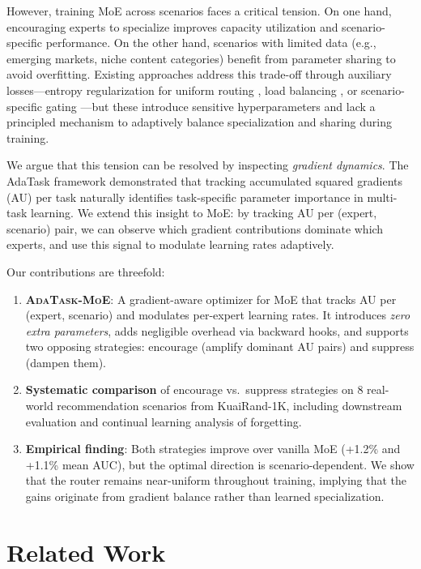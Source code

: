 \documentclass{article}
\begin{document}
However, training MoE across scenarios faces a critical tension.
On one hand, encouraging experts to specialize improves capacity utilization and scenario-specific performance.
On the other hand, scenarios with limited data (e.g., emerging markets, niche content categories) benefit from parameter sharing to avoid overfitting.
Existing approaches address this trade-off through auxiliary losses---entropy regularization for uniform routing \cite{fedus2022switch}, load balancing \cite{lepikhin2020gshard}, or scenario-specific gating \cite{ma2018modeling}---but these introduce sensitive hyperparameters and lack a principled mechanism to adaptively balance specialization and sharing during training.

We argue that this tension can be resolved by inspecting \emph{gradient dynamics}.
The AdaTask framework \cite{yang2023adatask} demonstrated that tracking accumulated squared gradients (AU) per task naturally identifies task-specific parameter importance in multi-task learning.
We extend this insight to MoE: by tracking AU per (expert, scenario) pair, we can observe which gradient contributions dominate which experts, and use this signal to modulate learning rates adaptively.

Our contributions are threefold:
\begin{enumerate}
    \item \textbf{\textsc{AdaTask-MoE}}: A gradient-aware optimizer for MoE that tracks AU per (expert, scenario) and modulates per-expert learning rates. It introduces \emph{zero extra parameters}, adds negligible overhead via backward hooks, and supports two opposing strategies: encourage (amplify dominant AU pairs) and suppress (dampen them).

    \item \textbf{Systematic comparison} of encourage vs.\ suppress strategies on 8 real-world recommendation scenarios from KuaiRand-1K, including downstream evaluation and continual learning analysis of forgetting.

    \item \textbf{Empirical finding}: Both strategies improve over vanilla MoE (+1.2\% and +1.1\% mean AUC), but the optimal direction is scenario-dependent. We show that the router remains near-uniform throughout training, implying that the gains originate from gradient balance rather than learned specialization.
\end{enumerate}

\section{Related Work}
\label{sec:related}
\end{document}
